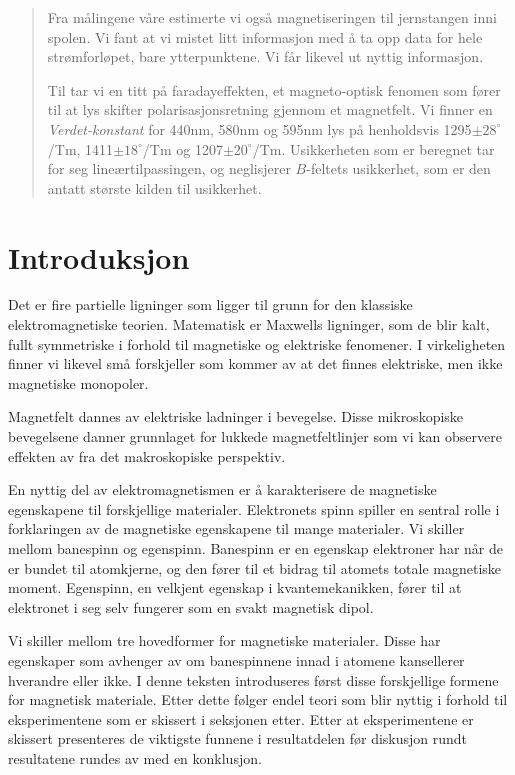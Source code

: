 \documentclass[a4paper,11pt, twocolumn]{article}
\begin{document}
\begin{abstract}
	Fra målingene våre estimerte vi også magnetiseringen til jernstangen inni spolen. Vi fant at vi mistet litt informasjon med å ta opp data for hele strømforløpet, bare ytterpunktene. Vi får likevel ut nyttig informasjon. 

Til tar vi en titt på faradayeffekten, et magneto-optisk fenomen som fører til at lys skifter polarisasjonsretning gjennom et magnetfelt. Vi finner en \textit{Verdet-konstant} for 440nm, 580nm og 595nm lys på henholdsvis 1295$\pm 28^\circ$/Tm, 1411$\pm18^\circ$/Tm og 1207$\pm20^\circ$/Tm. Usikkerheten som er beregnet tar for seg lineærtilpassingen, og neglisjerer $B$-feltets usikkerhet, som er den antatt største kilden til usikkerhet.

\end{abstract}

\section{Introduksjon}
Det er fire partielle ligninger som ligger til grunn for den klassiske elektromagnetiske teorien. Matematisk er Maxwells ligninger, som de blir kalt, fullt symmetriske i forhold til magnetiske og elektriske fenomener. I virkeligheten finner vi likevel små forskjeller som kommer av at det finnes elektriske, men ikke magnetiske monopoler.

Magnetfelt dannes av elektriske ladninger i bevegelse. Disse mikroskopiske bevegelsene danner grunnlaget for lukkede magnetfeltlinjer som vi kan observere effekten av fra det makroskopiske perspektiv. 

En nyttig del av elektromagnetismen er å karakterisere de magnetiske egenskapene til forskjellige materialer. Elektronets spinn spiller en sentral rolle i forklaringen av de magnetiske egenskapene til mange materialer. Vi skiller mellom banespinn og egenspinn. Banespinn er en egenskap elektroner har når de er bundet til atomkjerne, og den fører til et bidrag til atomets totale magnetiske moment. Egenspinn, en velkjent egenskap i kvantemekanikken, fører til at elektronet i seg selv fungerer som en svakt magnetisk dipol.

Vi skiller mellom tre hovedformer for magnetiske materialer. Disse har egenskaper som avhenger av om banespinnene innad i atomene kansellerer hverandre eller ikke. I denne teksten introduseres først disse forskjellige formene for magnetisk materiale. Etter dette følger endel teori som blir nyttig i forhold til eksperimentene som er skissert i seksjonen etter. Etter at eksperimentene er skissert presenteres de viktigste funnene i resultatdelen før diskusjon rundt resultatene rundes av med en konklusjon.
\end{document}
